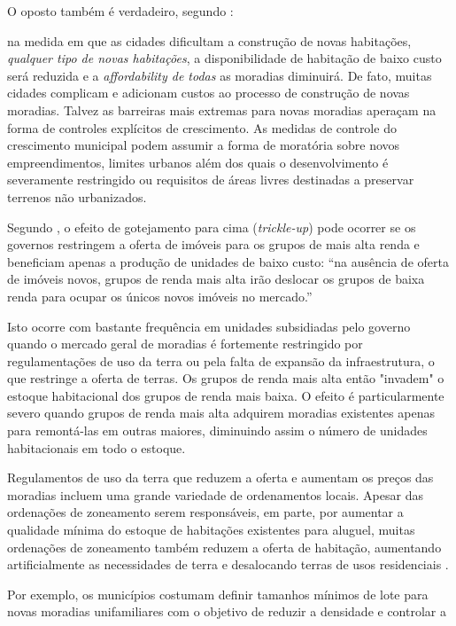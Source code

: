 \documentclass[
	12pt,				%
	oneside,			%
	a4paper,			%
	chapter=TITLE,		%
	section=TITLE,		%
	english,			%
	brazil				%
	]{abntex2}
\begin{document}
\begin{refsection}
O oposto também é verdadeiro, segundo \textcite[p.~205-206]{quigley}:
\begin{citacao} 
na medida em que as cidades dificultam a construção de novas habitações,
\emph{qualquer tipo de novas habitações}, a disponibilidade de habitação de
baixo custo será reduzida e a \emph{affordability de todas} as moradias
diminuirá. De fato, muitas cidades complicam e adicionam custos ao processo
de construção de novas moradias. Talvez as barreiras mais extremas para novas
moradias aperaçam na forma de controles explícitos de crescimento. As medidas de
controle do crescimento municipal podem assumir a forma de moratória sobre novos
empreendimentos, limites urbanos além dos quais o desenvolvimento é severamente
restringido ou requisitos de áreas livres destinadas a preservar terrenos não
urbanizados.
\end{citacao}
Segundo \textcite[p.~241]{bertau}, o efeito de gotejamento para cima (\emph{trickle-up}) pode
ocorrer se os governos restringem a oferta de imóveis para os grupos de mais
alta renda e beneficiam apenas a produção de unidades de baixo custo: ``na
ausência de oferta de imóveis novos, grupos de renda mais alta irão deslocar os
grupos de baixa renda para ocupar os únicos novos imóveis no mercado.''
\begin{citacao}
Isto ocorre com bastante frequência em unidades subsidiadas pelo governo quando
o mercado geral de moradias é fortemente restringido por regulamentações de uso
da terra ou pela falta de expansão da infraestrutura, o que restringe a oferta
de terras. Os grupos de renda mais alta então "invadem" o estoque habitacional
dos grupos de renda mais baixa. O efeito é particularmente severo quando grupos
de renda mais alta adquirem moradias existentes apenas para remontá-las em
outras maiores, diminuindo assim o número de unidades habitacionais em todo o
estoque.
\cite[p.241]{bertaud}
\end{citacao}
Regulamentos de uso da terra que reduzem a oferta e aumentam os preços das
moradias incluem uma grande variedade de ordenamentos locais. Apesar das
ordenações de zoneamento serem responsáveis, em parte, por aumentar a qualidade
mínima do estoque de habitações existentes para aluguel, muitas ordenações de
zoneamento também reduzem a oferta de habitação, aumentando artificialmente as
necessidades de terra e desalocando terras de usos residenciais \autocite[
p.~206]{quigley}.
\begin{citacao}
Por exemplo, os municípios costumam definir tamanhos mínimos de lote para novas
moradias unifamiliares com o objetivo de reduzir a densidade e controlar a

\end{citacao}
\end{refsection}
\end{document}
